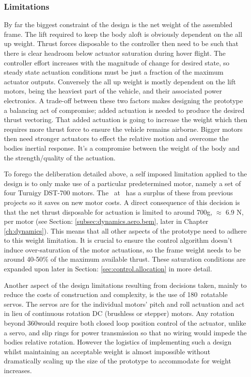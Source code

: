 \subsubsection{Limitations}
\label{subsubsec:intro.foreword.limits}
By far the biggest constraint of the design is the net weight of the assembled frame. The lift required to keep the body aloft is obviously dependent on the all up weight. Thrust forces disposable to the controller then need to be such that there is clear headroom below actuator saturation during hover flight. The controller effort increases with the magnitude of change for desired state, so steady state actuation conditions must be just a fraction of the maximum actuator outputs. Conversely the all up weight is mostly dependent on the lift motors, being the heaviest part of the vehicle, and their associated power electronics. A trade-off between these two factors makes designing the prototype a balancing act of compromise; added actuation is needed to produce the desired thrust vectoring. That added actuation is going to increase the weight which then requires more thrust force to ensure the vehicle remains airborne. Bigger motors then need stronger actuators to effect the relative motion and overcome the bodies inertial response. It's a compromise between the weight of the body and the strength/quality of the actuation.
\par
To forego the deliberation detailed above, a self imposed limitation applied to the design is to only make use of a particular predetermined motor, namely a set of four Turnigy DST-700 motors. The \dept ~at \uni ~has a surplus of these from previous projects so it saves on new motor costs. A direct consequence of this decision is that the net thrust disposable for actuation is limited to around 700g, $\approx$ 6.9 N, per motor (see Section: \ref{subsec:dynamics.aero.bem}, later in Chapter \ref{ch:dynamics}). This means that all other aspects of the prototype need to adhere to this weight limitation. It is crucial to ensure the control algorithm doesn't induce over-saturation of the motor actuations, so the frame weight needs to be around 40-50\% of the maximum available thrust. These saturation conditions are expanded upon later in Section: \ref{sec:control.allocation} in more detail.
\par
Another aspect of the design limitations resulting from decisions taken, mainly to reduce the costs of construction and complexity, is the use of 180\textdegree ~rotatable servos. The servos are for the individual motors' pitch and roll actuation and act in lieu of continuous rotation DC (brushless or stepper) motors. Any rotation beyond 360\textdegree would require both closed loop position control of the actuator, unlike a servo, and slip rings for power transmission so that no wiring would impede the bodies relative rotation. However the logistics of implementing such a design whilst maintaining an acceptable weight is almost impossible without dramatically scaling up the size of the prototype to accommodate for weight increases.
